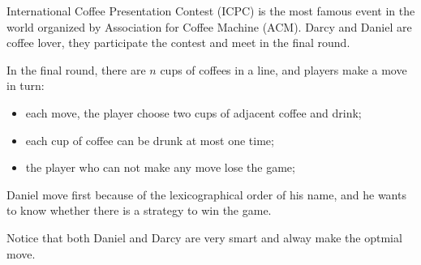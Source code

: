 International Coffee Presentation Contest (ICPC) is the most famous event in the world organized by Association for Coffee Machine (ACM). Darcy and Daniel are coffee lover, they participate the contest and meet in the final round. 

In the final round, there are $n$ cups  of coffees in a line,  and players make a move in turn:

\begin{itemize}
\item each move, the player choose two cups of adjacent coffee and drink;
\item each cup of coffee can be drunk at most one time;
\item the player who can not make any move lose the game;
\end{itemize}

Daniel move first because of the lexicographical order of his name, and he wants to know whether there is a strategy to win the game.

Notice that both Daniel and Darcy are very smart and alway make the optmial move.
